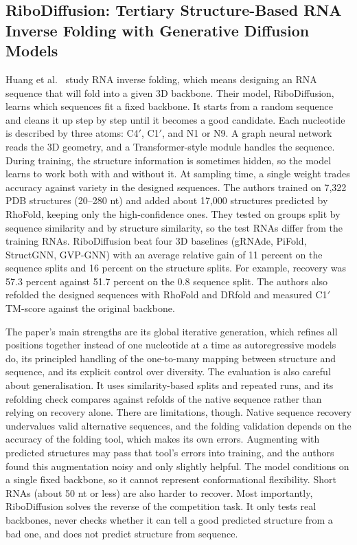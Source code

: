 \documentclass{FastFyp}
\begin{document}
\subsection{RiboDiffusion: Tertiary Structure-Based RNA Inverse Folding with Generative Diffusion Models}
Huang et al.~\cite{huang2024ribodiffusion} study RNA inverse folding, which means designing an RNA sequence that will fold into a given 3D backbone. Their model, RiboDiffusion, learns which sequences fit a fixed backbone. It starts from a random sequence and cleans it up step by step until it becomes a good candidate. Each nucleotide is described by three atoms: C4$'$, C1$'$, and N1 or N9. A graph neural network reads the 3D geometry, and a Transformer-style module handles the sequence. During training, the structure information is sometimes hidden, so the model learns to work both with and without it. At sampling time, a single weight trades accuracy against variety in the designed sequences. The authors trained on 7,322 PDB structures (20--280 nt) and added about 17,000 structures predicted by RhoFold, keeping only the high-confidence ones. They tested on groups split by sequence similarity and by structure similarity, so the test RNAs differ from the training RNAs. RiboDiffusion beat four 3D baselines (gRNAde, PiFold, StructGNN, GVP-GNN) with an average relative gain of 11 percent on the sequence splits and 16 percent on the structure splits. For example, recovery was 57.3 percent against 51.7 percent on the 0.8 sequence split. The authors also refolded the designed sequences with RhoFold and DRfold and measured C1$'$ TM-score against the original backbone.

The paper's main strengths are its global iterative generation, which refines all positions together instead of one nucleotide at a time as autoregressive models do, its principled handling of the one-to-many mapping between structure and sequence, and its explicit control over diversity. The evaluation is also careful about generalisation. It uses similarity-based splits and repeated runs, and its refolding check compares against refolds of the native sequence rather than relying on recovery alone. There are limitations, though. Native sequence recovery undervalues valid alternative sequences, and the folding validation depends on the accuracy of the folding tool, which makes its own errors. Augmenting with predicted structures may pass that tool's errors into training, and the authors found this augmentation noisy and only slightly helpful. The model conditions on a single fixed backbone, so it cannot represent conformational flexibility. Short RNAs (about 50 nt or less) are also harder to recover. Most importantly, RiboDiffusion solves the reverse of the competition task. It only tests real backbones, never checks whether it can tell a good predicted structure from a bad one, and does not predict structure from sequence.
\end{document}
